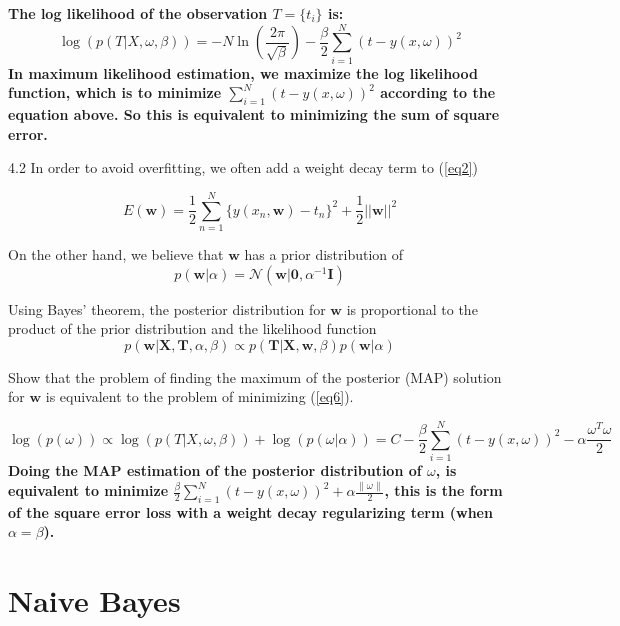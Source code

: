 \documentclass{article}
\theoremstyle{definition}
\theoremstyle{definition}
\theoremstyle{remark}
\begin{document}
\begin{addmargin}[3em]{2em}
  \textbf{The log likelihood of the observation $T=\{t_i\}$ is:}
  \[
  \log(p(T | X, \omega, \beta)) = -N \ln(\frac{2 \pi}{\sqrt{\beta}}) - \frac{\beta}{2} \sum_{i=1}^N {(t - y(x, \omega))}^2
  \]
  \textbf{In maximum likelihood estimation, we maximize the log likelihood function, which is to minimize $\sum_{i=1}^N {(t - y(x, \omega))}^2$ according to the equation above. So this is equivalent to minimizing the sum of square error.}
\end{addmargin}

4.2 In order to avoid overfitting, we often add a weight decay term to (\ref{eq2})

\begin{equation}\label{eq6}
  E(\bm w) = \frac{1}{2}\sum_{n=1}^N\{y(x_n, \bm w)-t_n\}^2 + \frac{1}{2}||\bm w||^2
\end{equation}

On the other hand, we believe that $\bm w$ has a prior distribution of
\begin{equation}\label{eq7}
  p(\bm w|\alpha) = \mathcal N(\bm w|\bm 0, \alpha^{-1}\bm I)
\end{equation}

Using Bayes’ theorem, the posterior distribution for $\bm w$ is proportional to the product of the prior distribution and the likelihood function
\begin{equation}\label{eq8}
  p(\bm w|\bm X, \bm T, \alpha, \beta) \propto p(\bm T|\bm X, \bm w, \beta)p(\bm w|\alpha)
\end{equation}

Show that the problem of finding the maximum of the posterior (MAP) solution for $\bm w$ is equivalent to the problem of minimizing (\ref{eq6}).


\begin{addmargin}[3em]{2em}
  \[
  \log(p(\omega)) \propto \log(p(T | X, \omega, \beta)) + \log(p(\omega | \alpha)) = C - \frac{\beta}{2} \sum_{i=1}^N {(t - y(x, \omega))}^2 - \alpha \frac{\omega^T \omega}{2}
  \]
  \textbf{Doing the MAP estimation of the posterior distribution of $\omega$, is equivalent to minimize $\frac{\beta}{2} \sum_{i=1}^N {(t - y(x, \omega))}^2 + \alpha \frac{\|\omega\|}{2}$, this is the form of the square error loss with a weight decay regularizing term (when $\alpha = \beta$).}
\end{addmargin}

\section*{Naive Bayes}
\end{document}
